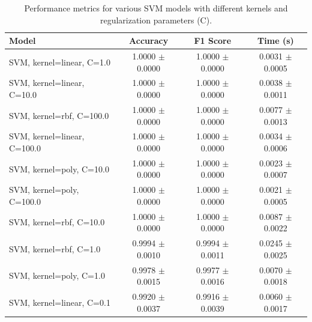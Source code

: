 \begin{table}[h!]
\centering
\begin{tabular}{|l|c|c|c|}
\hline
\textbf{Model} & \textbf{Accuracy} & \textbf{F1 Score} & \textbf{Time (s)} \\
\hline
SVM, kernel=linear, C=1.0    & 1.0000 $\pm$ 0.0000 & 1.0000 $\pm$ 0.0000 & 0.0031 $\pm$ 0.0005 \\
\hline
SVM, kernel=linear, C=10.0   & 1.0000 $\pm$ 0.0000 & 1.0000 $\pm$ 0.0000 & 0.0038 $\pm$ 0.0011 \\
\hline
SVM, kernel=rbf, C=100.0     & 1.0000 $\pm$ 0.0000 & 1.0000 $\pm$ 0.0000 & 0.0077 $\pm$ 0.0013 \\
\hline
SVM, kernel=linear, C=100.0  & 1.0000 $\pm$ 0.0000 & 1.0000 $\pm$ 0.0000 & 0.0034 $\pm$ 0.0006 \\
\hline
SVM, kernel=poly, C=10.0     & 1.0000 $\pm$ 0.0000 & 1.0000 $\pm$ 0.0000 & 0.0023 $\pm$ 0.0007 \\
\hline
SVM, kernel=poly, C=100.0    & 1.0000 $\pm$ 0.0000 & 1.0000 $\pm$ 0.0000 & 0.0021 $\pm$ 0.0005 \\
\hline
SVM, kernel=rbf, C=10.0      & 1.0000 $\pm$ 0.0000 & 1.0000 $\pm$ 0.0000 & 0.0087 $\pm$ 0.0022 \\
\hline
SVM, kernel=rbf, C=1.0       & 0.9994 $\pm$ 0.0010 & 0.9994 $\pm$ 0.0011 & 0.0245 $\pm$ 0.0025 \\
\hline
SVM, kernel=poly, C=1.0      & 0.9978 $\pm$ 0.0015 & 0.9977 $\pm$ 0.0016 & 0.0070 $\pm$ 0.0018 \\
\hline
SVM, kernel=linear, C=0.1    & 0.9920 $\pm$ 0.0037 & 0.9916 $\pm$ 0.0039 & 0.0060 $\pm$ 0.0017 \\
\hline
\end{tabular}
\caption{Performance metrics for various SVM models with different kernels and regularization parameters (C).}
\label{tab:svm_metrics_m}
\end{table}

